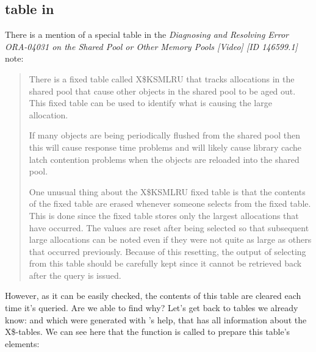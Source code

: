 \subsection{ table in \oracle}
\myindex{\oracle}

There is a mention of a special table in the \emph{Diagnosing and Resolving Error ORA-04031 
on the Shared Pool or Other Memory Pools [Video] [ID 146599.1]} note:

\begin{framed}
\begin{quotation}
There is a fixed table called X\$KSMLRU that tracks allocations in the shared pool that cause other objects 
in the shared pool to be aged out. This fixed table can be used to identify what is causing the large allocation.

If many objects are being periodically flushed from the shared pool then this will cause response time problems 
and will likely cause library cache latch contention problems when the objects are reloaded into the shared pool.

One unusual thing about the X\$KSMLRU fixed table is that the contents of the fixed table are erased whenever 
someone selects from the fixed table. This is done since the fixed table stores only the largest allocations 
that have occurred. The values are reset after being selected so that subsequent large allocations can be noted 
even if they were not quite as large as others that occurred previously. Because of this resetting, the output 
of selecting from this table should be carefully kept since it cannot be retrieved back after the query is issued.
\end{quotation}
\end{framed}

However, as it can be easily checked, the contents of this table are cleared each time it's queried.
Are we able to find why?
Let's get back to tables we already know:  and  
which were generated with \oracletables's help, that has all information about the X\$-tables. We can see here 
that the  function is called to prepare this table's elements:

